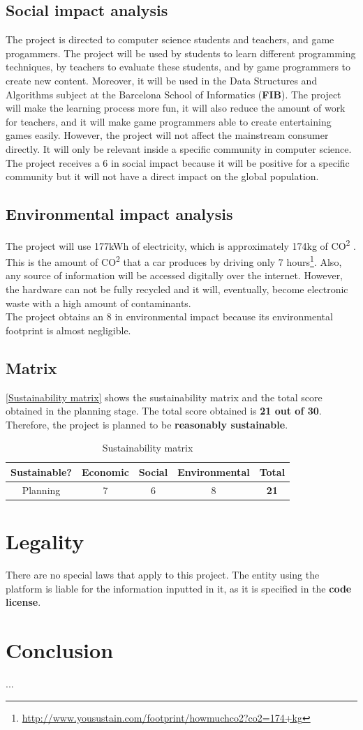 \documentclass[a4paper,11pt,titlepage,abstract,numbers=noenddot,automark,mnsy,intlimits,rgb,dvipsnames]{report}
\begin{document}
\section{Social impact analysis}
The project is directed to computer science students and teachers, and game progammers. The project
will be used by students to learn different programming techniques, by teachers to evaluate these students, and
by game programmers to create new content. Moreover, it will be used in the Data Structures and Algorithms subject
at the Barcelona School of Informatics (\textbf{FIB}). The project will make the learning process more fun, it will also
reduce the amount of work for teachers, and it will make game programmers able to create entertaining games easily.
However, the project will not affect the mainstream consumer directly. It will only be relevant inside a specific
community in computer science.
\\[0.1cm]
The project receives a 6 in social impact because it will be positive for a specific community but it will not
have a direct impact on the global population.
\section{Environmental impact analysis}
The project will use 177kWh of electricity, which is approximately 174kg
of CO\textsuperscript{2} \cite{co2}. This is the amount of CO\textsuperscript{2} that a car produces by driving only 7
hours\footnote{\url{http://www.yousustain.com/footprint/howmuchco2?co2=174+kg}}. Also, any source of
information will be accessed digitally over the internet. However, the hardware can not be fully
recycled and it will, eventually, become electronic waste with a high amount of contaminants.
\\[0.1cm]
The project obtains an 8 in environmental impact because its environmental footprint is almost negligible.
\section{Matrix}
\autoref{Sustainability matrix} shows the sustainability matrix and the total score obtained in the planning
stage. The total score obtained is \textbf{21 out of 30}. Therefore, the project is planned to be \textbf{reasonably sustainable}.
\begin{table}[H]
\centering
\begin{tabular}{c | c | c | c | c}
\textbf{Sustainable?} & \textbf{Economic} & \textbf{Social} & \textbf{Environmental} & \textbf{Total}\\
\hline
Planning & 7 & 6 & 8 & \textbf{21}\\
\end{tabular}
\caption{Sustainability matrix}
\label{Sustainability matrix}
\end{table}
\chapter{Legality}
There are no special laws that apply to this project. The entity using the platform
is liable for the information inputted in it, as it is specified in the \textbf{code license}.
\chapter{Conclusion}
...


\end{document}
